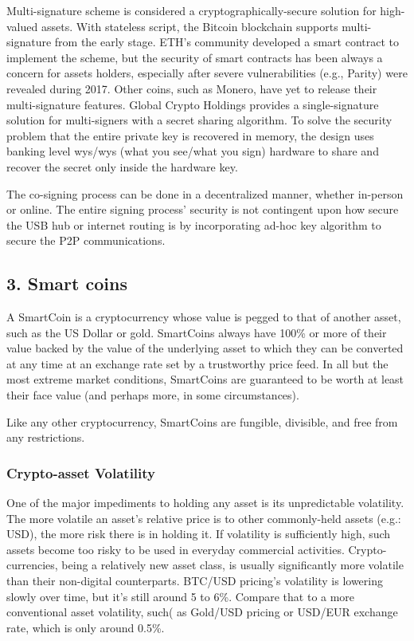 \documentclass[11pt]{article}
\begin{document}
Multi-signature scheme is considered a cryptographically-secure solution for high-valued assets. With stateless script, the Bitcoin blockchain supports multi-signature from the early stage. ETH's community developed a smart contract to implement the scheme, but the security of smart contracts has been always a concern for assets holders, especially after severe vulnerabilities (e.g., Parity) were revealed during 2017. Other coins, such as Monero, have yet to release their multi-signature features. Global Crypto Holdings provides a single-signature solution for multi-signers with a secret sharing algorithm. To solve the security problem that the entire private key is recovered in memory, the design uses banking level wys/wys (what you see/what you sign) hardware to share and recover the secret only inside the hardware key.


The co-signing process can be done in a decentralized manner, whether in-person or online. The entire signing process' security is not contingent upon how secure the USB hub or internet routing is by incorporating ad-hoc key algorithm to secure the P2P communications.


\subsection{3. Smart coins}

A SmartCoin is a cryptocurrency whose value is pegged to that of another asset, such as the US Dollar or gold. SmartCoins always have 100\% or more of their value backed by the value of the underlying asset to which they can be converted at any time at an exchange rate set by a trustworthy price feed. In all but the most extreme market conditions, SmartCoins are guaranteed to be worth at least their face value (and perhaps more, in some circumstances).


Like any other cryptocurrency, SmartCoins are fungible, divisible, and free from any restrictions.


\subsubsection{Crypto-asset Volatility}

One of the major impediments to holding any asset is its unpredictable volatility. The more volatile an asset's relative price is to other commonly-held assets (e.g.: USD), the more risk there is in holding it. If volatility is sufficiently high, such assets become too risky to be used in everyday commercial activities. Crypto-currencies, being a relatively new asset class, is usually significantly more volatile than their non-digital counterparts. BTC/USD pricing's volatility is lowering slowly over time, but it's still around 5 to 6\%. Compare that to a more conventional asset volatility, such( as Gold/USD pricing or USD/EUR exchange rate, which is only around 0.5\%.
\end{document}
